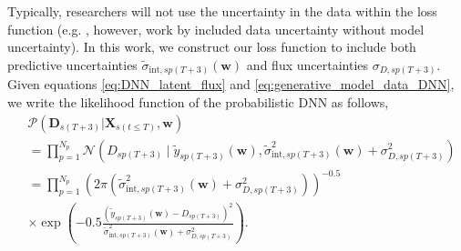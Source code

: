 \documentclass[fleqn,usenatbib]{mnras}
\begin{document}
Typically, researchers will not use the uncertainty in the data within the loss function (e.g. \citealt{JamalBloom2020,Villar2021_Anomalydetection}, however, work by \citealt{Naul2018AStars} included data uncertainty without model uncertainty). In this work, we construct our loss function to include both predictive uncertainties $\tilde{\sigma}_{\mathrm{int},sp(T+3)}(\bm{w})$ and flux uncertainties $\sigma_{D,{sp(T+3)}}$.
Given equations \ref{eq:DNN_latent_flux} and \ref{eq:generative_model_data_DNN}, we write the likelihood function of the probabilistic DNN as follows,
\begin{equation}
    \begin{split}
      &\mathcal{P}(\bm{D}_{s(T+3)}|\bm{X}_{s(t \le T)}, \bm{w}) \\
      &= \prod^{N_p}_{p=1} \mathcal{N} \left( D_{sp(T+3)} \mid \tilde{y}_{sp(T+3)}(\bm{w}), \tilde{\sigma}^2_{\mathrm{int},sp(T+3)}(\bm{w}) + \sigma_{D,{sp(T+3)}}^2  \right) \\
            &= \prod^{N_p}_{p=1} \left( 2\pi(\tilde{\sigma}^2_{\mathrm{int},sp(T+3)}(\bm{w}) + \sigma_{D,{sp(T+3)}}^2) \right)^{-0.5} \\
            &\times \exp{\left( -0.5 \frac{(\tilde{y}_{sp(T+3)}(\bm{w})-D_{sp(T+3)})^2}{\tilde{\sigma}^2_{\mathrm{int},sp(T+3)}(\bm{w}) + \sigma_{D,{sp(T+3)}}^2} \right) }.
    \end{split}
\label{eq:DNN_likelihood}
\end{equation}
\end{document}
